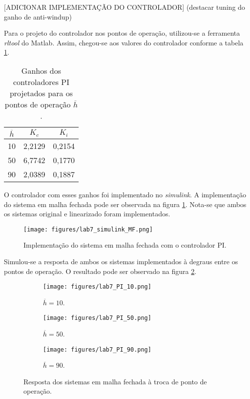 \documentclass[a4paper]{report}
\begin{document}
[ADICIONAR IMPLEMENTAÇÃO DO CONTROLADOR] (destacar tuning do ganho de anti-windup)

Para o projeto do controlador nos pontos de operação, utilizou-se a ferramenta \emph{rltool} do Matlab. Assim, chegou-se aos valores do controlador conforme a tabela \ref{tab:ganhos-PI}.

\begin{table}[H]
    \centering
    \caption{Ganhos dos controladores PI projetados para os pontos de operação $\overline{h}$.}
    \label{tab:ganhos-PI}
    \begin{tabular}{c | c | c}
	$\overline{h}$ & $K_c$ & $K_i$ \\
	\hline 
	10 & 2,2129 & 0,2154 \\
	50 & 6,7742 & 0,1770 \\
	90 & 2,0389 & 0,1887
    \end{tabular}
\end{table}

O controlador com esses ganhos foi implementado no \emph{simulink}. A implementação do sistema em malha fechada pode ser observada na figura \ref{fig:figures-lab7_simulink_MF-png}. Nota-se que ambos os sistemas original e linearizado foram implementados.

\begin{figure}[H]
    \centering
    \texttt{[image: figures/lab7\_simulink\_MF.png]}
    \caption{Implementação do sistema em malha fechada com o controlador PI.}
    \label{fig:figures-lab7_simulink_MF-png}
\end{figure}

Simulou-se a resposta de ambos os sistemas implementados à degraus entre os pontos de operação. O resultado pode ser observado na figura \ref{fig:figures-lab4_1_resposta_simulink}.

\begin{figure}[H]
    \centering
    \begin{subfigure}{0.32\textwidth}
	\texttt{[image: figures/lab7\_PI\_10.png]}
	\caption{$\overline{h} = 10$.}
    \end{subfigure}
    \begin{subfigure}{0.32\textwidth}
	\texttt{[image: figures/lab7\_PI\_50.png]}
	\caption{$\overline{h} = 50$.}
    \end{subfigure}
    \begin{subfigure}{0.32\textwidth}
	\texttt{[image: figures/lab7\_PI\_90.png]}
	\caption{$\overline{h} = 90$.}
    \end{subfigure}
    \caption{Resposta dos sistemas em malha fechada à troca de ponto de operação.}
    \label{fig:figures-lab4_1_resposta_simulink}
\end{figure}
\end{document}
